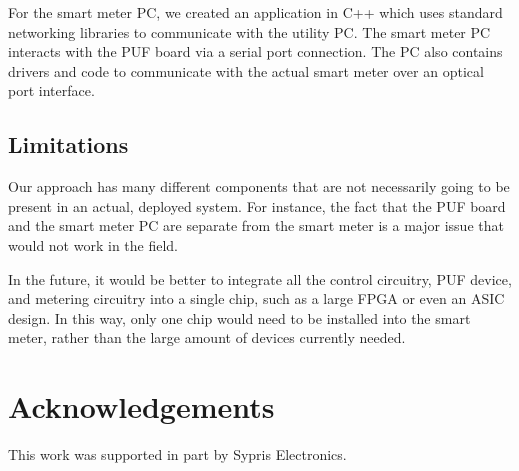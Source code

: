 For the smart meter PC, we created an application in C++ which uses standard networking libraries to communicate
with the utility PC. The smart meter PC interacts with the PUF board via a serial port connection. The PC also contains
drivers and code to communicate with the actual smart meter over an optical port interface.

\subsection{Limitations}
Our approach has many different components that are not necessarily going to be present in an actual, deployed
system. For instance, the fact that the PUF board and the smart meter PC are separate from the smart meter is
a major issue that would not work in the field. 

In the future, it would be better to integrate all the control circuitry,
PUF device, and metering circuitry into a single chip, such as a large FPGA or even an ASIC design. In this way, only
one chip would need to be installed into the smart meter, rather than the large amount of devices currently needed.

\section{Acknowledgements}
This work was supported in part by Sypris Electronics.